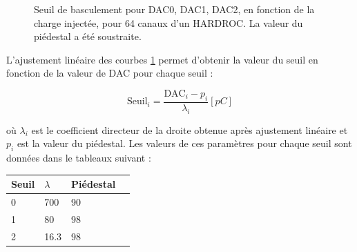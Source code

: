 \begin{figure}[ht!]
	\centering
	\hfill
	\hfill
	\caption{Seuil de basculement pour DAC0, DAC1, DAC2, en fonction de la charge injectée, pour \num{64} canaux d'un HARDROC. La valeur du piédestal a été soustraite.}
	\label{seuils}
\end{figure}%

L'ajustement linéaire des courbes \ref{seuils} permet d'obtenir la valeur du seuil en fonction de la valeur de DAC pour chaque seuil :

\begin{equation}
\mbox{Seuil}_{i}=\frac{\mbox{DAC}_{i}-p_{i}}{\lambda_{i}} [pC]
\label{equationn}
\end{equation}

où $\lambda_{i}$ est le coefficient directeur de la droite obtenue après ajustement linéaire et $p_{i}$ est la valeur du piédestal. Les valeurs de ces paramètres pour chaque seuil sont données dans le tableaux suivant :

\begin{table}[H]
	\centering
\begin{tabular}{|O|O|O|N}
	\hline 
	Seuil & $\lambda$ & Piédestal \\ 
	\hline 
	\num{0}&\num{700} &\num{90} \\ 
	\hline 
	\num{1}& \num{80} & \num{98} \\ 
	\hline 
	\num{2}&\num{16.3} &\num{98} \\ 
	\hline 
\end{tabular} 
\end{table}

